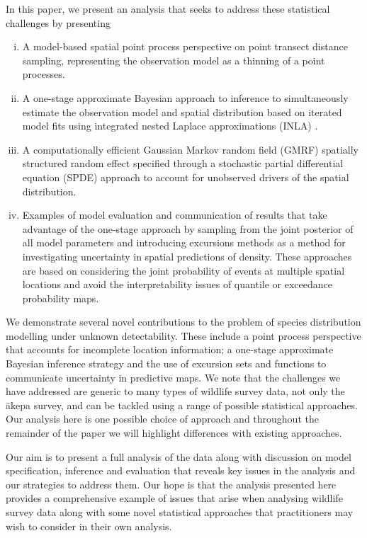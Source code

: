 \documentclass[preprint,12pt]{elsarticle}
\newcommand{\akepa}{\textquotesingle\={a}kepa}  %
\begin{document}
In this paper, we present an analysis that seeks to address these statistical challenges by presenting

\begin{enumerate}[(i)]
	\item A model-based spatial point process perspective on point transect distance sampling, representing the observation model as a thinning of a point processes.
	\item A one-stage approximate Bayesian approach to inference to simultaneously estimate the observation model and spatial distribution based on iterated model fits using integrated nested Laplace approximations (INLA) \citep{rue_approximate_2009}.
	\item A computationally efficient Gaussian Markov random field (GMRF) spatially structured random effect specified through a stochastic partial differential equation (SPDE) approach \citep{lindgren_explicit_2011} to account for unobserved drivers of the spatial distribution.
	\item Examples of model evaluation and communication of results that take advantage of the one-stage approach by sampling from the joint posterior of all model parameters and introducing excursions methods \citep{bolin_excursion_2015} as a method for investigating uncertainty in spatial predictions of density.  These approaches are based on considering the joint probability of events at multiple spatial locations and avoid the interpretability issues of quantile or exceedance probability maps.
\end{enumerate}

We demonstrate several novel contributions to the problem of species distribution modelling under unknown detectability.  These include a point process perspective that accounts for incomplete location information; a one-stage approximate Bayesian inference strategy and the use of excursion sets and functions to communicate uncertainty in predictive maps.  We note that the challenges we have addressed are generic to many types of wildlife survey data, not only the \akepa{} survey, and can be tackled using a range of possible statistical approaches.  Our analysis here is one possible choice of approach and throughout the remainder of the paper we will highlight differences with existing approaches.

Our aim is to present a full analysis of the data along with discussion on model specification, inference and evaluation that reveals key issues in the analysis and our strategies to address them.  Our hope is that the analysis presented here provides a comprehensive example of issues that arise when analysing wildlife survey data along with some novel statistical approaches that practitioners may wish to consider in their own analysis.
\end{document}
